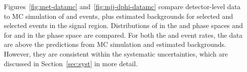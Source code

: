 \documentclass[cernpreprint,txfonts,UKenglish,texlive=2016]{\ATLASLATEXPATH atlasdoc}
\begin{document}
Figures~\ref{fig:met-datamc} and~\ref{fig:mjj-dphi-datamc}  compare
detector-level data to 
MC simulation of \Znunu{} and \Zll{} events, plus estimated
backgrounds for selected \ptmissjet{} and selected \lljet{}
events in the signal region. Distributions of  \ptmiss{} in the \onejet{} and \vbf{}
phase spaces and for \mjj{} and \dphijj{} in the \vbf{} phase space
are compared.
For both the \ptmissjet{} and \lljet{} event rates, the data are above the
predictions from MC simulation and estimated
backgrounds. However, they are consistent within the 
systematic uncertainties, which are discussed in Section~\ref{sec:syst} in more detail.
\begin{figure}
	\begin{center}


\end{center}
\end{figure}
\end{document}
